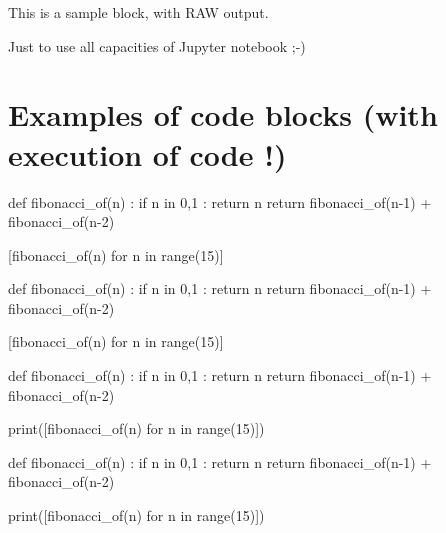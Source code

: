 \documentclass[a4paper,11pt]{article}
\begin{document}
\begin{NotebookPitonRaw}{\linewidth}
This is a sample block, with RAW output.

Just to use all capacities of Jupyter notebook ;-)
\end{NotebookPitonRaw}

\section{Examples of code blocks (with execution of code !)}

\begin{codehigh}
\begin{NotebookPitonIn}{0.75\linewidth}
def fibonacci_of(n) :
  if n in {0,1} :
    return n
  return fibonacci_of(n-1) + fibonacci_of(n-2)

[fibonacci_of(n) for n in range(15)]
\end{NotebookPitonIn}
\end{codehigh}

\begin{NotebookPitonIn}{0.75\linewidth}
def fibonacci_of(n) :
	if n in {0,1} :
		return n
	return fibonacci_of(n-1) + fibonacci_of(n-2)

[fibonacci_of(n) for n in range(15)]
\end{NotebookPitonIn}

\begin{codehigh}
\begin{NotebookPitonOut}{0.75\linewidth}
def fibonacci_of(n) :
  if n in {0,1} :
    return n
  return fibonacci_of(n-1) + fibonacci_of(n-2)

print([fibonacci_of(n) for n in range(15)])
\end{NotebookPitonOut}
\end{codehigh}

\begin{NotebookPitonOut}{\linewidth}
def fibonacci_of(n) :
	if n in {0,1} :
		return n
	return fibonacci_of(n-1) + fibonacci_of(n-2)

print([fibonacci_of(n) for n in range(15)])
\end{NotebookPitonOut}

\begin{codehigh}
\SetJupyterParSkip{\baselineskip}
\setcounter{JupyterIn}{11}
\end{codehigh}

\SetJupyterParSkip{\baselineskip}
\setcounter{JupyterIn}{14}
\end{document}
